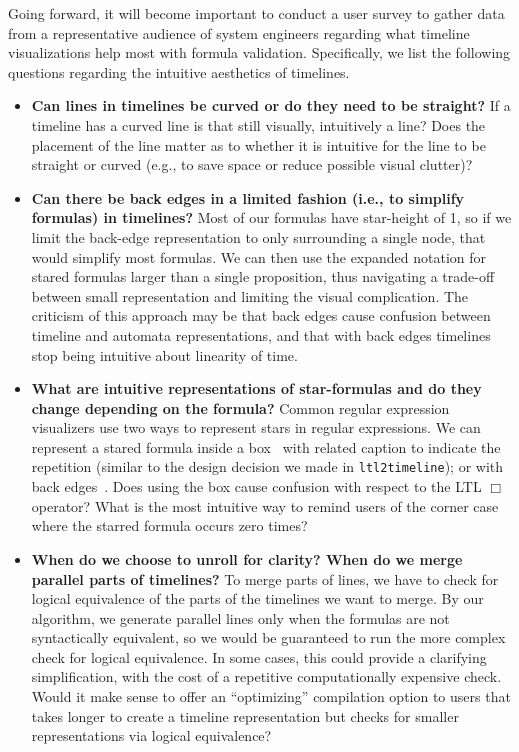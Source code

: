 \documentclass[conference]{IEEEtran}
\theoremstyle{definition}
\theoremstyle{remark}
\newcommand{\tool}{\hspace{0.1cm}\texttt{ltl2timeline}}
\begin{document}
Going forward, it will become important to conduct a user survey to gather data from a representative audience of system engineers regarding what timeline visualizations help most with formula validation. Specifically, we list the following questions regarding the intuitive aesthetics of timelines.
\begin{itemize}
\item {\bf Can lines in timelines be curved or do they need to be straight?} If a timeline has a curved line is that still visually, intuitively a line? Does the placement of the line matter as to whether it is intuitive for the line to be straight or curved (e.g., to save space or reduce possible visual clutter)?

\item {\bf Can there be back edges in a limited fashion (i.e., to simplify formulas) in timelines?} Most of our formulas have star-height of 1, so if we limit the back-edge representation to only surrounding a single node, that would simplify most formulas. We can then use the expanded notation for stared formulas larger than a single proposition, thus navigating a trade-off between small representation and limiting the visual complication. The criticism of this approach may be that back edges cause confusion between timeline and automata representations, and that with back edges timelines stop being intuitive about linearity of time.

\item {\bf What are intuitive representations of star-formulas and do they change depending on the formula?} Common regular expression visualizers use two ways to represent stars in regular expressions. We can represent a stared formula inside a box~\cite{B22} with related caption to indicate the repetition (similar to the design decision we made in \tool); or with back edges~\cite{A20}. Does using the box cause confusion with respect to the LTL $\Box$ operator? What is the most intuitive way to remind users of the corner case where the starred formula occurs zero times?

\item {\bf When do we choose to unroll for clarity? When do we merge parallel parts of timelines?} To merge parts of lines, we have to check for logical equivalence of the parts of the timelines we want to merge. By our algorithm, we generate parallel lines only when the formulas are not syntactically equivalent, so we would be guaranteed to run the more complex check for logical equivalence. In some cases, this could provide a clarifying simplification, with the cost of a repetitive computationally expensive check. Would it make sense to offer an ``optimizing'' compilation option to users that takes longer to create a timeline representation but checks for smaller representations via logical equivalence?
\end{itemize}
\end{document}

